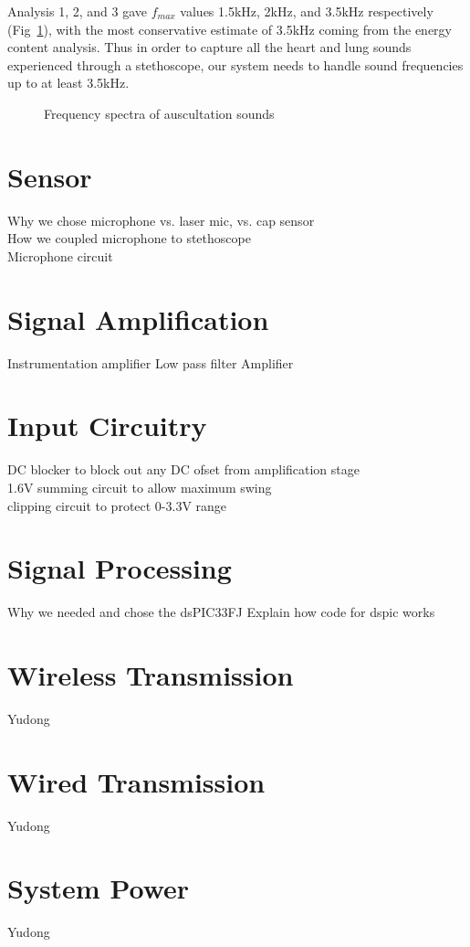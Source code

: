 Analysis 1, 2, and 3 gave $f_{max}$ values 1.5kHz, 2kHz, and 3.5kHz respectively (Fig~\ref{fig:ausc_spectra}), with the most conservative estimate of 3.5kHz coming from the energy content analysis. Thus in order to capture all the heart and lung sounds experienced through a stethoscope, our system needs to handle sound frequencies up to at least 3.5kHz. 
\begin{figure}[htb]
	\centering
	\caption{Frequency spectra of auscultation sounds}
	\label{fig:ausc_spectra}
\end{figure}

\section{Sensor}
Why we chose microphone vs. laser mic, vs. cap sensor \\
How we coupled microphone to stethoscope \\
Microphone circuit

\section{Signal Amplification}
Instrumentation amplifier
Low pass filter
Amplifier

\section{Input Circuitry}
DC blocker to block out any DC ofset from amplification stage\\
1.6V summing circuit to allow maximum swing\\
clipping circuit to protect 0-3.3V range \\

\section{Signal Processing}
Why we needed and chose the dsPIC33FJ
Explain how code for dspic works

\section{Wireless Transmission}
Yudong

\section{Wired Transmission}
Yudong

\section{System Power}
Yudong